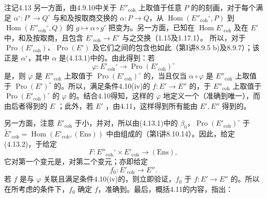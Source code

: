 \begin{SGAresult}{注记}{4.13}
另一方面，由4.9.10中关于 $E''_{\mathrm{coh}}$ 上取值于任意 $P$ 的的刻画，对于每个满足 $\alpha^{\circ}:P^{\circ}\to Q^{\circ}$ 与和及按取商交换的 $\alpha:P\to Q$，从 $\operatorname{Hom}(E''_{\mathrm{coh}}{}^{\circ},P)$ 到 $\operatorname{Hom}(E''_{\mathrm{coh}}{}^{\circ},Q)$ 的 $g\mapsto\alpha\circ g'$ 把变为。另一方面，已知在 $\operatorname{Hom}E'_{\mathrm{coh}}$ 及在 $E'$ 中，和及按取商，且包含 $E'_{\mathrm{coh}}\to E'$ 与之交换（1.15及1.17.1）。
所以，对于 $\operatorname{Pro}(E'_{\mathrm{coh}})$、$\operatorname{Pro}(E')$ 及它们之间的包含也如此（第I讲8.9.5 b)及8.9.7）；该正是 $\alpha^{\circ}$，其中 $\alpha$ 是(4.13.1)中的。由此得到：若
\[
\varphi:E'_{\mathrm{coh}}{}^{\circ}\longrightarrow\operatorname{Pro}(E'_{\mathrm{coh}})^{\circ}\tag{4.13.2}
\]
是，则 $\varphi$ 是 $E''_{\mathrm{coh}}$ 上取值于 $\operatorname{Pro}(E'_{\mathrm{coh}})^{\circ}$ 的，当且仅当 $\alpha\circ\varphi$ 是 $E''_{\mathrm{coh}}$ 上取值于 $\operatorname{Pro}(E')^{\circ}$ 的。所以，满足条件4.10(iv)的 $f:E'\to E''$ 的，于 $E''_{\mathrm{coh}}$ 上取值于 $\operatorname{Pro}(E'_{\mathrm{coh}})^{\circ}$ 的 $\varphi$ 的。结合4.10得知，这样的 $\varphi$ 地定义一个（准确到唯一），而由后者得到的 $E$ ；此外，若 $E'$ ，由4.11，这样得到所有能由 $E',E''$ 得到的。

另一方面，注意 $E'_{\mathrm{coh}}$ 于小，并对，所以由(4.13.1)中的 $\beta_0$，$\operatorname{Pro}(E'_{\mathrm{coh}})^{\circ}$ 于 $\check E'_{\mathrm{coh}}=\operatorname{Hom}(E'_{\mathrm{coh}},(\mathrm{Ens}))$ 中由组成的（第I讲8.10.14）。因此，给定(4.13.2)，于给定
\[
F:E''_{\mathrm{coh}}{}^{\circ}\times E'_{\mathrm{coh}}\longrightarrow(\mathrm{Ens}),\tag{4.13.3}
\]
它对第一个变元是，对第二个变元；亦即给定
\[
f_0:E'_{\mathrm{coh}}\longrightarrow E''.\tag{4.13.4}
\]
若 $f$ 是与 $\varphi$ 关联且满足条件4.10(iv)的，则立即验证，$f_0$ 于 $f:E'\to E''$ 的。所以在所考虑的条件下，$f_0$ 确定 $f$，准确到。最后，概括4.11的内容，指出：
\end{SGAresult}

